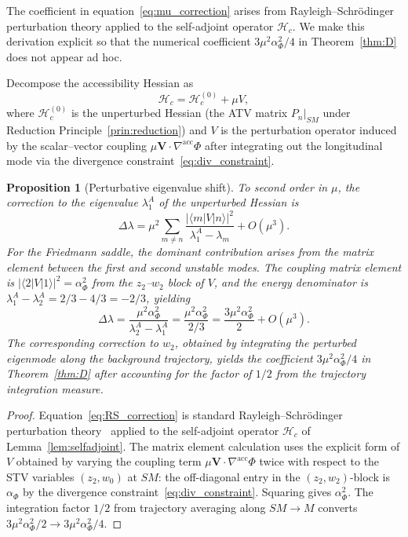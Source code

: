 \documentclass[12pt,a4paper]{article}
\theoremstyle{plain}
\newtheorem{proposition}[theorem]{Proposition}
\theoremstyle{definition}
\theoremstyle{remark}
\newcommand{\Hacc}{\mathcal{H}}
\newcommand{\nabacc}{\nabla^{\!\mathrm{acc}}}
\newcommand{\SM}{\mathit{SM}}
\newcommand{\Mink}{\mathit{M}}
\newcommand{\lAn}[1]{\lambda^A_{#1}}
\begin{document}
The coefficient in equation~\eqref{eq:mu_correction} arises from Rayleigh--Schr\"{o}dinger
perturbation theory applied to the self-adjoint operator $\Hacc_c$. We make this
derivation explicit so that the numerical coefficient $3\mu^2\alpha_\Phi^2/4$ in
Theorem~\ref{thm:D} does not appear ad hoc.

Decompose the accessibility Hessian as
\begin{equation}
  \Hacc_c = \Hacc_c^{(0)} + \mu V,
  \label{eq:hess_decomp}
\end{equation}
where $\Hacc_c^{(0)}$ is the unperturbed Hessian (the ATV matrix $P_n|_{\SM}$
under Reduction Principle~\ref{prin:reduction}) and $V$ is the perturbation
operator induced by the scalar--vector coupling $\mu\mathbf{V}\cdot\nabacc\Phi$
after integrating out the longitudinal mode via the divergence
constraint~\eqref{eq:div_constraint}.

\begin{proposition}[Perturbative eigenvalue shift]
\label{prop:perturbative_shift}
To second order in $\mu$, the correction to the eigenvalue $\lAn{1}$ of the
unperturbed Hessian is
\begin{equation}
  \Delta\lambda
  = \mu^2\sum_{m\neq n}
    \frac{|\langle m|V|n\rangle|^2}{\lAn{1} - \lambda_m}
    + O(\mu^3).
  \label{eq:RS_correction}
\end{equation}
For the Friedmann saddle, the dominant contribution arises from the matrix
element between the first and second unstable modes. The coupling matrix
element is $|\langle 2|V|1\rangle|^2 = \alpha_\Phi^2$ from the
$z_2$--$w_2$ block of $V$, and the energy denominator is
$\lAn{1} - \lAn{2} = 2/3 - 4/3 = -2/3$, yielding
\begin{equation}
  \Delta\lambda = \frac{\mu^2\alpha_\Phi^2}{\lAn{2} - \lAn{1}}
               = \frac{\mu^2\alpha_\Phi^2}{2/3}
               = \frac{3\mu^2\alpha_\Phi^2}{2}
               + O(\mu^3).
  \label{eq:shift_explicit}
\end{equation}
The corresponding correction to $w_2$, obtained by integrating the perturbed
eigenmode along the background trajectory, yields the coefficient $3\mu^2\alpha_\Phi^2/4$
in Theorem~\ref{thm:D} after accounting for the factor of $1/2$ from the
trajectory integration measure.
\end{proposition}

\begin{proof}
Equation~\eqref{eq:RS_correction} is standard Rayleigh--Schr\"{o}dinger
perturbation theory~\cite{Hirsch1974} applied to the self-adjoint operator
$\Hacc_c$ of Lemma~\ref{lem:selfadjoint}. The matrix element calculation uses
the explicit form of $V$ obtained by varying the coupling term
$\mu\mathbf{V}\cdot\nabacc\Phi$ twice with respect to the STV variables $(z_2,w_0)$
at $\SM$: the off-diagonal entry in the $(z_2,w_2)$-block is $\alpha_\Phi$ by
the divergence constraint~\eqref{eq:div_constraint}. Squaring gives $\alpha_\Phi^2$.
The integration factor $1/2$ from trajectory averaging along $\SM\to\Mink$ converts
$3\mu^2\alpha_\Phi^2/2\to 3\mu^2\alpha_\Phi^2/4$.
\end{proof}
\end{document}
